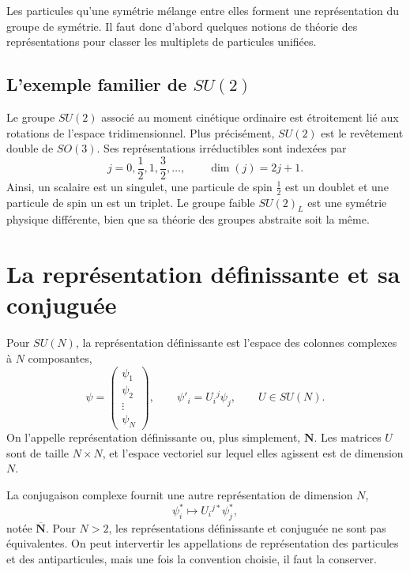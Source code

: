 Les particules qu’une symétrie mélange entre elles forment une représentation du groupe de symétrie. Il faut donc d’abord quelques notions de théorie des représentations pour classer les multiplets de particules unifiées.

\subsection{L’exemple familier de \texorpdfstring{\(SU(2)\)}{SU(2)}}

Le groupe \(SU(2)\) associé au moment cinétique ordinaire est étroitement lié aux rotations de l’espace tridimensionnel. Plus précisément, \(SU(2)\) est le revêtement double de \(SO(3)\). Ses représentations irréductibles sont indexées par
\begin{equation}
j=0,\frac12,1,\frac32,\ldots,
\qquad
\dim(j)=2j+1.
\label{eq:l10-su2-spins}
\end{equation}
Ainsi, un scalaire est un singulet, une particule de spin \(\tfrac12\) est un doublet et une particule de spin un est un triplet. Le groupe faible \(SU(2)_L\) est une symétrie physique différente, bien que sa théorie des groupes abstraite soit la même.

\section{La représentation définissante et sa conjuguée}

Pour \(SU(N)\), la représentation définissante est l’espace des colonnes complexes à \(N\) composantes,
\begin{equation}
\psi=
\begin{pmatrix}
\psi_1\\
\psi_2\\
\vdots\\
\psi_N
\end{pmatrix},
\qquad
\psi'_i=U_i{}^j\psi_j,
\qquad
U\in SU(N).
\label{eq:l10-defining}
\end{equation}
On l’appelle représentation définissante ou, plus simplement, \(\mathbf N\). Les matrices \(U\) sont de taille \(N\times N\), et l’espace vectoriel sur lequel elles agissent est de dimension \(N\).

La conjugaison complexe fournit une autre représentation de dimension \(N\),
\begin{equation}
\psi_i^*\longmapsto U_i{}^{j*}\psi_j^*,
\label{eq:l10-conjugate}
\end{equation}
notée \(\overline{\mathbf N}\). Pour \(N>2\), les représentations définissante et conjuguée ne sont pas équivalentes. On peut intervertir les appellations de représentation des particules et des antiparticules, mais une fois la convention choisie, il faut la conserver.

